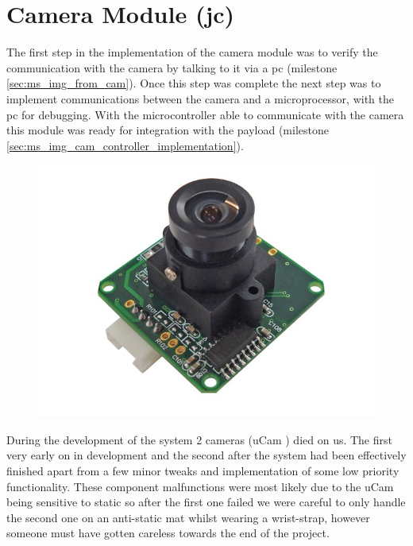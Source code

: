 \section{Camera Module (jc)}
\label{sec:John_Implementation}

The first step in the implementation of the camera module was to verify the communication with the camera by talking to it via a pc (milestone \ref{sec:ms_img_from_cam}). Once this step was complete the next step was to implement communications between the camera and a microprocessor, with the pc for debugging. With the microcontroller able to communicate with the camera this module was ready for integration with the payload (milestone \ref{sec:ms_img_cam_controller_implementation}).

\begin{figure}[H]
        \centering
        \includegraphics[width=1.00\textwidth]{figures/uCam.jpg}
        \label{fig:ucam_pic}
\end{figure}

During the development of the system 2 cameras (uCam \cite{ucam_datasheet}) died on us. The first very early on in development and the second after the system had been effectively finished apart from a few minor tweaks and implementation of some low priority functionality. These component malfunctions were most likely due to the uCam being sensitive to static so after the first one failed we were careful to only handle the second one on an anti-static mat whilst wearing a wrist-strap, however someone must have gotten careless towards the end of the project.

